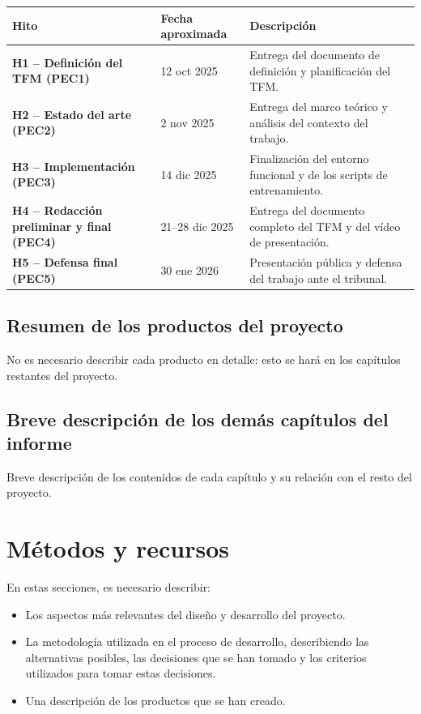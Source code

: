 \documentclass[12pt,a4paper,twoside,openany]{book}
\begin{document}
\begin{longtable}{|>{\bfseries}p{2.8cm}|p{3cm}|p{9cm}|}
\hline
Hito & Fecha aproximada & Descripción \\
\hline
H1 -- Definición del TFM (PEC1) & 12 oct 2025 & Entrega del documento de definición y planificación del TFM. \\ \hline
H2 -- Estado del arte (PEC2) & 2 nov 2025 & Entrega del marco teórico y análisis del contexto del trabajo. \\ \hline
H3 -- Implementación (PEC3) & 14 dic 2025 & Finalización del entorno funcional y de los scripts de entrenamiento. \\ \hline
H4 -- Redacción preliminar y final (PEC4) & 21--28 dic 2025 & Entrega del documento completo del TFM y del vídeo de presentación. \\ \hline
H5 -- Defensa final (PEC5) & 30 ene 2026 & Presentación pública y defensa del trabajo ante el tribunal. \\ \hline
\end{longtable}


\subsection{Resumen de los productos del proyecto}

No es necesario describir cada producto en detalle: esto se hará en los capítulos restantes del proyecto.

\subsection{Breve descripción de los demás capítulos del informe}

Breve descripción de los contenidos de cada capítulo y su relación con el resto del proyecto.

\section{Métodos y recursos}

En estas secciones, es necesario describir:

\begin{itemize}
    \item Los aspectos más relevantes del diseño y desarrollo del proyecto.
    \item La metodología utilizada en el proceso de desarrollo, describiendo las alternativas posibles, las decisiones que se han tomado y los criterios utilizados para tomar estas decisiones.
    \item Una descripción de los productos que se han creado.
\end{itemize}
\end{document}
